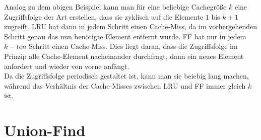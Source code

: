 \documentclass[a4paper,10pt]{article}
\begin{document}
\begin{enumerate}
Analog zu dem obigen Beispiiel kann man für eine beliebige Cachegröße $k$ eine Zugriffsfolge der Art erstellen, dass sie zyklisch auf die Elemente $1$ bis $k+1$ zugreift. LRU hat dann in jedem Schritt einen Cache-Miss, da im vorhergehenden Schritt genau das nun benötigte Element entfernt wurde. FF hat nur in jedem $k-ten$ Schritt einen Cache-Miss. Dies liegt daran, dass die Zugriffsfolge im Prinzip alle Cache-Element nacheinander durchfragt, dann ein neues Element anfordert und wieder von vorne anfängt.\\
Da die Zugriffsfolge periodisch gestaltet ist, kann man sie beiebig lang machen, während das Verhältnis der Cache-Misses zwischen LRU und FF immer gleich $k$ ist. 

\end{enumerate}

\section{Union-Find}
\end{document}
